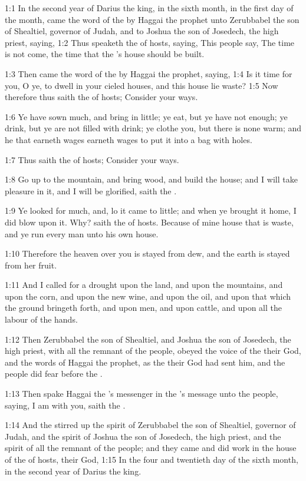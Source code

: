 

1:1 In the second year of Darius the king, in the sixth month, in the
first day of the month, came the word of the \LORD by Haggai the
prophet unto Zerubbabel the son of Shealtiel, governor of Judah, and
to Joshua the son of Josedech, the high priest, saying, 1:2 Thus
speaketh the \LORD of hosts, saying, This people say, The time is not
come, the time that the \LORD's house should be built.

1:3 Then came the word of the \LORD by Haggai the prophet, saying, 1:4
Is it time for you, O ye, to dwell in your cieled houses, and this
house lie waste?  1:5 Now therefore thus saith the \LORD of hosts;
Consider your ways.

1:6 Ye have sown much, and bring in little; ye eat, but ye have not
enough; ye drink, but ye are not filled with drink; ye clothe you, but
there is none warm; and he that earneth wages earneth wages to put it
into a bag with holes.

1:7 Thus saith the \LORD of hosts; Consider your ways.

1:8 Go up to the mountain, and bring wood, and build the house; and I
will take pleasure in it, and I will be glorified, saith the \LORD.

1:9 Ye looked for much, and, lo it came to little; and when ye brought
it home, I did blow upon it. Why? saith the \LORD of hosts. Because of
mine house that is waste, and ye run every man unto his own house.

1:10 Therefore the heaven over you is stayed from dew, and the earth
is stayed from her fruit.

1:11 And I called for a drought upon the land, and upon the mountains,
and upon the corn, and upon the new wine, and upon the oil, and upon
that which the ground bringeth forth, and upon men, and upon cattle,
and upon all the labour of the hands.

1:12 Then Zerubbabel the son of Shealtiel, and Joshua the son of
Josedech, the high priest, with all the remnant of the people, obeyed
the voice of the \LORD their God, and the words of Haggai the prophet,
as the \LORD their God had sent him, and the people did fear before the
\LORD.

1:13 Then spake Haggai the \LORD's messenger in the \LORD's message unto
the people, saying, I am with you, saith the \LORD.

1:14 And the \LORD stirred up the spirit of Zerubbabel the son of
Shealtiel, governor of Judah, and the spirit of Joshua the son of
Josedech, the high priest, and the spirit of all the remnant of the
people; and they came and did work in the house of the \LORD of hosts,
their God, 1:15 In the four and twentieth day of the sixth month, in
the second year of Darius the king.

